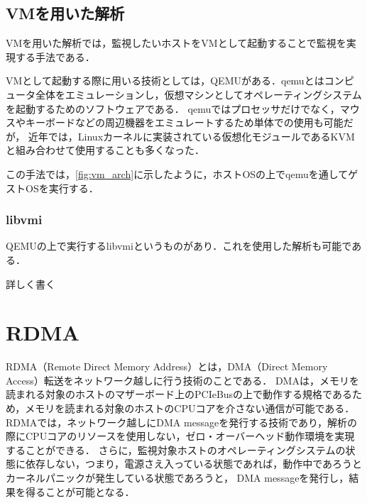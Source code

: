 \subsection{VMを用いた解析}

VMを用いた解析では，監視したいホストをVMとして起動することで監視を実現する手法である．

VMとして起動する際に用いる技術としては，QEMU\cite{qemu}がある．qemuとはコンピュータ全体をエミュレーションし，仮想マシンとしてオペレーティングシステムを起動するためのソフトウェアである．
qemuではプロセッサだけでなく，マウスやキーボードなどの周辺機器をエミュレートするため単体での使用も可能だが，
近年では，Linuxカーネルに実装されている仮想化モジュールであるKVM\cite{kvm}と組み合わせて使用することも多くなった．

この手法では，\ref{fig:vm_arch}に示したように，ホストOSの上でqemuを通してゲストOSを実行する．


\subsubsection{libvmi}

QEMUの上で実行するlibvmi\cite{osti_1334968}というものがあり．これを使用した解析も可能である．

詳しく書く

\section{RDMA}

RDMA（Remote Direct Memory Address）とは，DMA（Direct Memory Access）\cite{amini1995system}転送をネットワーク越しに行う技術のことである．
DMAは，メモリを読まれる対象のホストのマザーボード上のPCIeBusの上で動作する規格であるため，メモリを読まれる対象のホストのCPUコアを介さない通信が可能である．
RDMAでは，ネットワーク越しにDMA messageを発行する技術であり，解析の際にCPUコアのリソースを使用しない，ゼロ・オーバーヘッド動作環境を実現することができる．
さらに，監視対象ホストのオペレーティングシステムの状態に依存しない，つまり，電源さえ入っている状態であれば，動作中であろうとカーネルパニックが発生している状態であろうと，
DMA messageを発行し，結果を得ることが可能となる．

